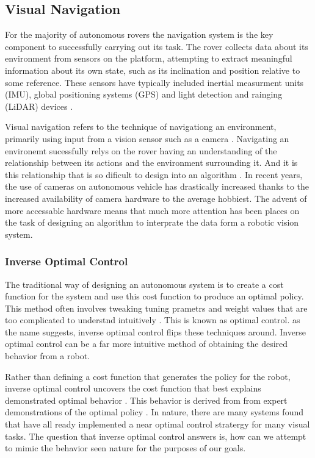 \documentclass{UoNMCHA}
\numberwithin{equation}{section}
\begin{document}
\subsection{Visual Navigation}\label{sec:visualNavigation}
For the majority of autonomous rovers the navigation system is the key component to successfully carrying out its task. The rover collects data about its environment from sensors on the platform, attempting to extract meaningful information about its own state, such as its inclination and position relative to some reference. These sensors have typically included inertial measurment units (IMU), global positioning systems (GPS) and light detection and rainging (LiDAR) devices \citep{wang2015obstacle}.

Visual navigation refers to the technique of navigationg an environment, primarily using input from a vision sensor such as a camera \citep{chatterjee2012vision}. Navigating an environemt sucessfully relys on the rover having an understanding of the relationship between its actions and the environment surrounding it. And it is this relationship that is so dificult to design into an algorithm \citep{zhu2017target}. In recent years, the use of cameras on autonomous vehicle has drastically increased thanks to the increased availability of camera hardware to the average hobbiest. The advent of more accessable hardware means that much more attention has been places on the task of designing an algorithm to interprate the data form a robotic vision system.

\subsubsection{Inverse Optimal Control}\label{sec:IOC}
The traditional way of designing an autonomous system is to create a cost function for the system and use this cost function to produce an optimal policy. This method often involves tweaking tuning prametrs and weight values that are too complicated to understnd intuitively \citep{ratliffinverse}. This is known as optimal control. as the name suggests, inverse optimal control flips these techniques around. Inverse optimal control can be a far more intuitive method of obtaining the desired behavior from a robot.

Rather than defining a cost function that generates the policy for the robot, inverse optimal control uncovers the cost function that best explains demonstrated optimal behavior \citep{ratliffinverse}. This behavior is derived from from expert demonstrations of the optimal policy \citep{levine2012continuous}. In nature, there are many systems found that have all ready implemented a near optimal control stratergy for many visual tasks. The question that inverse optimal control answers is, how can we attempt to mimic the behavior seen nature for the purposes of our goals.
\end{document}
